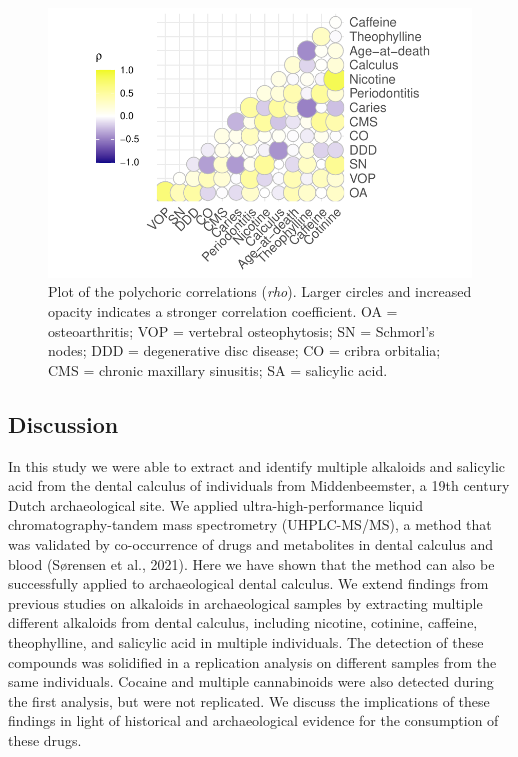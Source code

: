 \documentclass[
]{article}
\begin{document}
\begin{figure}

{\centering \includegraphics{paper_files/figure-pdf/fig-polycorr-1.pdf}

}

\caption{\label{fig-polycorr}Plot of the polychoric correlations
(\emph{rho}). Larger circles and increased opacity indicates a stronger
correlation coefficient. OA = osteoarthritis; VOP = vertebral
osteophytosis; SN = Schmorl's nodes; DDD = degenerative disc disease; CO
= cribra orbitalia; CMS = chronic maxillary sinusitis; SA = salicylic
acid.}

\end{figure}

\hypertarget{discussion}{%
\subsection{Discussion}\label{discussion}}

In this study we were able to extract and identify multiple alkaloids
and salicylic acid from the dental calculus of individuals from
Middenbeemster, a 19th century Dutch archaeological site. We applied
ultra-high-performance liquid chromatography-tandem mass spectrometry
(UHPLC-MS/MS), a method that was validated by co-occurrence of drugs and
metabolites in dental calculus and blood (Sørensen et al., 2021). Here
we have shown that the method can also be successfully applied to
archaeological dental calculus. We extend findings from previous studies
on alkaloids in archaeological samples by extracting multiple different
alkaloids from dental calculus, including nicotine, cotinine, caffeine,
theophylline, and salicylic acid in multiple individuals. The detection
of these compounds was solidified in a replication analysis on different
samples from the same individuals. Cocaine and multiple cannabinoids
were also detected during the first analysis, but were not replicated.
We discuss the implications of these findings in light of historical and
archaeological evidence for the consumption of these drugs.
\end{document}
